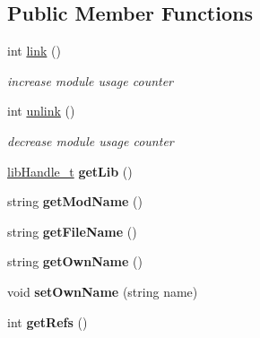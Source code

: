 \subsection*{Public Member Functions}
\begin{DoxyCompactItemize}
\item 
\mbox{\label{classModule_a2b4410ea8c8158eb4ccd32621ac3ac44}} 
int \hyperlink{classModule_a2b4410ea8c8158eb4ccd32621ac3ac44}{link} ()
\begin{DoxyCompactList}\small\item\em increase module usage counter \end{DoxyCompactList}\item 
\mbox{\label{classModule_a77961c31e38eed0460678e58b815ca9d}} 
int \hyperlink{classModule_a77961c31e38eed0460678e58b815ca9d}{unlink} ()
\begin{DoxyCompactList}\small\item\em decrease module usage counter \end{DoxyCompactList}\item 
\mbox{\label{classModule_ae15cbc8e4cc023389220f6bc1573e79a}} 
\hyperlink{Module_8h_acbeb44869400b78e5f4097d5c49fc093}{lib\+Handle\+\_\+t} {\bfseries get\+Lib} ()
\item 
\mbox{\label{classModule_a94c2adde5e84aa06271287caa52582fd}} 
string {\bfseries get\+Mod\+Name} ()
\item 
\mbox{\label{classModule_a17cd6df369ee653ebda1a7dd98ac80bd}} 
string {\bfseries get\+File\+Name} ()
\item 
\mbox{\label{classModule_a88fb093ef0a9a2689d35c2a2df7903a9}} 
string {\bfseries get\+Own\+Name} ()
\item 
\mbox{\label{classModule_a2cf459f20fb61bb1fde784852c0b4ae8}} 
void {\bfseries set\+Own\+Name} (string name)
\item 
\mbox{\label{classModule_a86d4d45174189e9ee7226ec366a4ab4e}} 
int {\bfseries get\+Refs} ()
\item 
\mbox{\label{classModule_a658eb3f9f97a6ea60d5c21c73c711d3e}} 

\end{DoxyCompactItemize}
